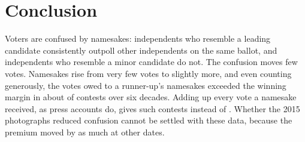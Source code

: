 \documentclass[11pt]{article}
\begin{document}
\begin{table}[htbp]
\centering\small
\caption{Bihar panchayat elections (2016, 2021): candidates who resemble the winner, against others placed third or lower.}
\label{tab:bihar}

\end{table}

\section{Conclusion}

Voters are confused by namesakes: independents who resemble a leading candidate consistently outpoll other independents on the same ballot, and independents who resemble a minor candidate do not. The confusion moves few votes. Namesakes rise from very few votes to slightly more, and even counting generously, the votes owed to a runner-up's namesakes exceeded the winning margin in about \ovLookPoint{} of \nMarginContests{} contests over six decades. Adding up every vote a namesake received, as press accounts do, gives \ovLookBound{} such contests instead of \ovLookPoint{}. Whether the 2015 photographs reduced confusion cannot be settled with these data, because the premium moved by as much at other dates.



\end{document}
